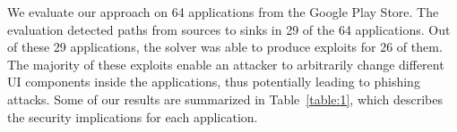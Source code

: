 



We evaluate our approach on 64 applications from the Google Play Store.
The evaluation detected paths from sources to sinks in 29 of the 64 applications. Out of these 29 applications, the solver was able to produce exploits for 26 of them. The majority of these exploits  enable an attacker to arbitrarily change different UI components inside the applications, thus potentially leading to phishing attacks. Some of our results are summarized in Table~\ref{table:1}, which describes the security implications for each application.


